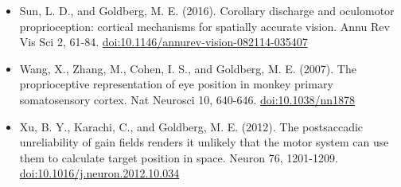 \documentclass[11pt,a4paper]{article}
\begin{document}
\begin{itemize}[itemsep=2pt,topsep=2pt]
\item Sun, L. D., and Goldberg, M. E. (2016). Corollary discharge and oculomotor proprioception: cortical mechanisms for spatially accurate vision. Annu Rev Vis Sci 2, 61-84. \href{https://doi.org/10.1146/annurev-vision-082114-035407}{doi:10.1146/annurev-vision-082114-035407}
\item Wang, X., Zhang, M., Cohen, I. S., and Goldberg, M. E. (2007). The proprioceptive representation of eye position in monkey primary somatosensory cortex. Nat Neurosci 10, 640-646. \href{https://doi.org/10.1038/nn1878}{doi:10.1038/nn1878}
\item Xu, B. Y., Karachi, C., and Goldberg, M. E. (2012). The postsaccadic unreliability of gain fields renders it unlikely that the motor system can use them to calculate target position in space. Neuron 76, 1201-1209. \href{https://doi.org/10.1016/j.neuron.2012.10.034}{doi:10.1016/j.neuron.2012.10.034}
\end{itemize}
\end{document}
